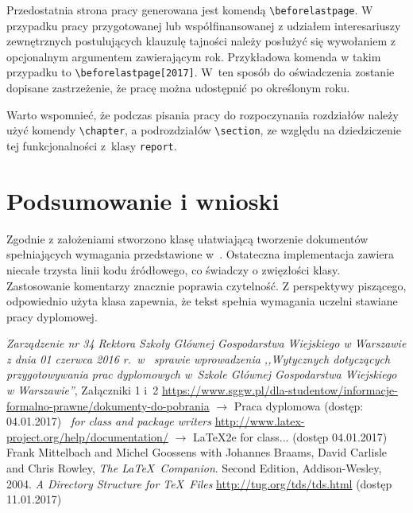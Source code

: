 \documentclass{SGGW-thesis}
\begin{document}
Przedostatnia strona pracy generowana jest komendą \verb|\beforelastpage|. W przypadku pracy przygotowanej lub współfinansowanej z udziałem interesariuszy zewnętrznych
postulujących klauzulę tajności należy posłużyć się wywołaniem z opcjonalnym argumentem zawierającym rok. Przykładowa komenda w takim przypadku to
\verb|\beforelastpage[2017]|. W~ten sposób do oświadczenia zostanie dopisane zastrzeżenie, że pracę można udostępnić po określonym roku.

Warto wspomnieć, że podczas pisania pracy do rozpoczynania rozdziałów należy użyć komendy \verb|\chapter|, a podrozdziałów \verb|\section|, ze względu na dziedziczenie tej
funkcjonalności z~klasy \verb|report|.


\chapter{Podsumowanie i wnioski}
Zgodnie z założeniami stworzono klasę ułatwiającą tworzenie dokumentów spełniających wymagania przedstawione w~\cite{wymagania}. Ostateczna implementacja zawiera niecałe
trzysta linii kodu źródłowego, co świadczy o zwięzłości klasy. Zastosowanie komentarzy znacznie poprawia czytelność. Z perspektywy piszącego, odpowiednio użyta klasa
zapewnia, że tekst spełnia wymagania uczelni stawiane pracy dyplomowej.


\begin{thebibliography}{9}
\textit{Zarządzenie nr 34 Rektora Szkoły Głównej Gospodarstwa Wiejskiego w Warszawie z dnia 01 czerwca 2016 r.\ w~ sprawie wprowadzenia ,,Wytycznych dotyczących
przygotowywania prac dyplomowych w~Szkole Głównej Gospodarstwa Wiejskiego w Warszawie''}, Załączniki 1 i~2
\url{https://www.sggw.pl/dla-studentow/informacje-formalno-prawne/dokumenty-do-pobrania}
$\rightarrow$ Praca dyplomowa (dostęp: 04.01.2017)
\textit{\LaTeXe\ for class and package writers} \url{http://www.latex-project.org/help/documentation/} $\rightarrow$ LaTeX2e for class... (dostęp 04.01.2017)
Frank Mittelbach and Michel Goossens with Johannes Braams, David Carlisle and Chris Rowley,
\textit{The \LaTeX\ Companion}. Second Edition,
Addison-Wesley, 2004.
\textit{A Directory Structure for \TeX\ Files} \url{http://tug.org/tds/tds.html} (dostęp 11.01.2017)
\end{thebibliography}

\beforelastpage
\end{document}
